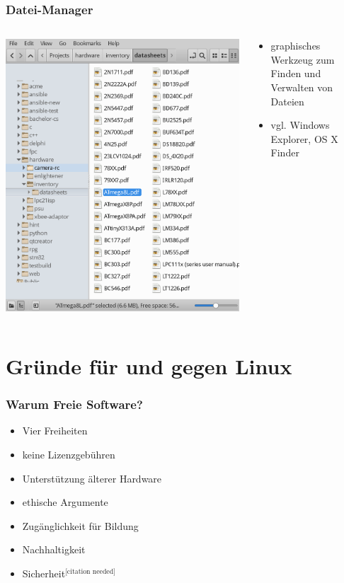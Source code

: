 \documentclass[t]{beamer}
\begin{document}
\begin{frame}
  \frametitle{Datei-Manager}
  \begin{columns}
    \begin{column}[T]{0.45\textwidth}
      \includegraphics[width=\textwidth]{img-src/file-manager.png}
    \end{column}
    \begin{column}{0.45\textwidth}
      \begin{itemize}
      \item graphisches Werkzeug zum Finden und Verwalten von Dateien
      \item vgl. Windows Explorer, OS X Finder
      \end{itemize}
    \end{column}
  \end{columns}
\end{frame}

\section{Gründe für und gegen Linux}
\begin{frame}
  \frametitle{Warum Freie Software?}
  \begin{itemize}
  \item Vier Freiheiten
  \item keine Lizenzgebühren
  \item Unterstützung älterer Hardware
  \item ethische Argumente
  \item Zugänglichkeit für Bildung
  \item Nachhaltigkeit
  \item Sicherheit${}^\text{[citation needed]}$
  \end{itemize}
\end{frame}
\end{document}
